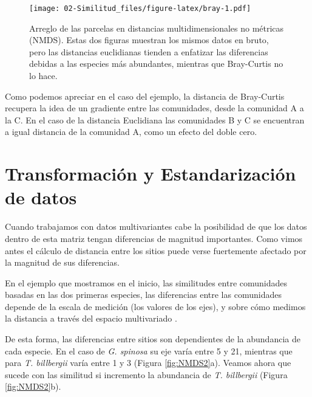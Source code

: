 \documentclass[
]{article}
\begin{document}
\begin{figure}
\centering
\texttt{[image: 02-Similitud\_files/figure-latex/bray-1.pdf]}
\caption{\label{fig:bray}Arreglo de las parcelas en distancias multidimensionales no métricas (NMDS). Estas dos figuras muestran los mismos datos en bruto, pero las distancias euclidianas tienden a enfatizar las diferencias debidas a las especies más abundantes, mientras que Bray-Curtis no lo hace.}
\end{figure}

Como podemos apreciar en el caso del ejemplo, la distancia de Bray-Curtis recupera la idea de un gradiente entre las comunidades, desde la comunidad A a la C. En el caso de la distancia Euclidiana las comunidades B y C se encuentran a igual distancia de la comunidad A, como un efecto del doble cero.

\hypertarget{transformaciuxf3n-y-estandarizaciuxf3n-de-datos}{%
\section{Transformación y Estandarización de datos}\label{transformaciuxf3n-y-estandarizaciuxf3n-de-datos}}

Cuando trabajamos con datos multivariantes cabe la posibilidad de que los datos dentro de esta matriz tengan diferencias de magnitud importantes. Como vimos antes el cálculo de distancia entre los sitios puede verse fuertemente afectado por la magnitud de sus diferencias.

En el ejemplo que mostramos en el inicio, las similitudes entre comunidades basadas en las dos primeras especies, las diferencias entre las comunidades depende de la escala de medición (los valores de los ejes), y sobre cómo medimos la distancia a través del espacio multivariado \citep{Stevens2009}.

De esta forma, las diferencias entre sitios son dependientes de la abundancia de cada especie. En el caso de \emph{G. spinosa} su eje varía entre 5 y 21, mientras que para \emph{T. billbergii} varía entre 1 y 3 (Figura \ref{fig:NMDS2}a). Veamos ahora que sucede con las similitud si incremento la abundancia de \emph{T. billbergii} (Figura \ref{fig:NMDS2}b).
\end{document}
